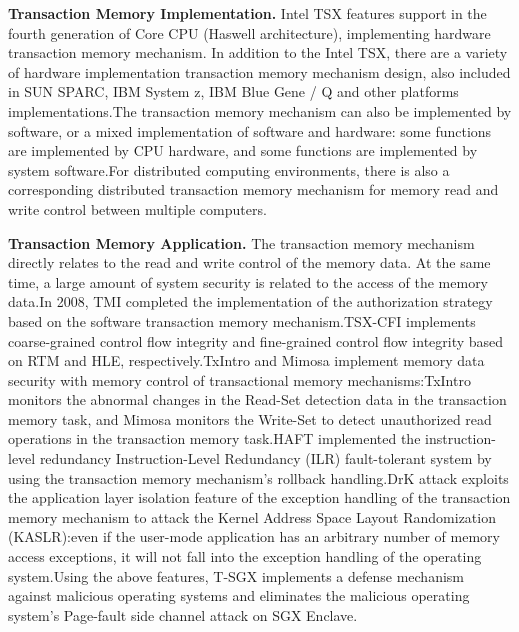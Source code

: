 \textbf{Transaction Memory Implementation.}
Intel TSX features support in the fourth generation of Core CPU (Haswell architecture), implementing hardware transaction memory mechanism. In addition to the Intel TSX, there are a variety of hardware implementation transaction memory mechanism design\cite{Hammond2004Transactional}\cite{Ananian2006Unbounded}, also included in SUN SPARC\cite{Dice2009Early}, IBM System z\cite{Jacobi2012Transactional}, IBM Blue Gene / Q\cite{Wang2012Evaluation} and other platforms implementations.The transaction memory mechanism can also be implemented by software\cite{Carlstrom2006The}\cite{Harris2005Composable}\cite{Ni2008Design}\cite{shavit1995software}\cite{Schindewolf2009Towards}\cite{Herlihy2006A}, or a mixed implementation of software and hardware\cite{Moore2006LogTM}\cite{Damron2006Hybrid}\cite{Kumar2006Hybrid}\cite{Rajwar2005Virtualizing}: some functions are implemented by CPU hardware, and some functions are implemented by system software.For distributed computing environments, there is also a corresponding distributed transaction memory mechanism\cite{Bocchino2008Software}\cite{Couceiro2009D2STM}\cite{Kotselidis2008DiSTM}\cite{Romano2010Cloud}\cite{Saad2011Snake} for memory read and write control between multiple computers.


\textbf{Transaction Memory Application.}
The transaction memory mechanism directly relates to the read and write control of the memory data. At the same time, a large amount of system security is related to the access of the memory data\cite{Szekeres2013Eternal}.In 2008, TMI\cite{Birgisson2008Enforcing} completed the implementation of the authorization strategy based on the software transaction memory mechanism.TSX-CFI implements coarse-grained control flow integrity and fine-grained control flow integrity based on RTM and HLE, respectively.TxIntro\cite{Liu2014Concurrent} and Mimosa\cite{Guan2015Protecting}  implement memory data security with memory control of transactional memory mechanisms:TxIntro monitors the abnormal changes in the Read-Set detection data in the transaction memory task, and Mimosa monitors the Write-Set to detect unauthorized read operations in the transaction memory task.HAFT\cite{Kuvaiskii2016HAFT} implemented the instruction-level redundancy Instruction-Level Redundancy (ILR) fault-tolerant system by using the transaction memory mechanism's rollback handling.DrK attack\cite{Jang2016Breaking} exploits the application layer isolation feature of the exception handling of the transaction memory mechanism to attack the Kernel Address Space Layout Randomization (KASLR):even if the user-mode application has an arbitrary number of memory access exceptions, it will not fall into the exception handling of the operating system.Using the above features, T-SGX\cite{Shih2017T} implements a defense mechanism against malicious operating systems and eliminates the malicious operating system's Page-fault side channel attack on SGX Enclave\cite{Xu2015Controlled}\cite{Shinde2015Preventing}.
